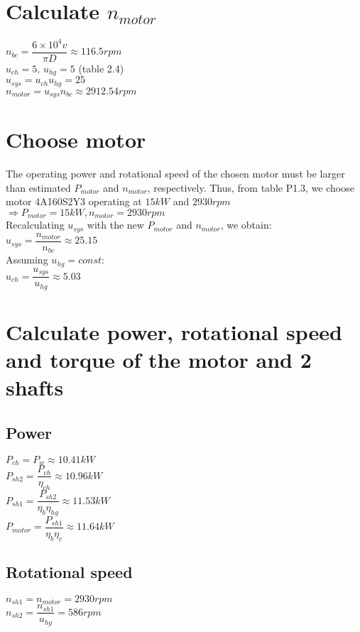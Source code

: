 \section{Calculate $ n_{motor} $}
$ n_{bc} = \dfrac{6\times10^4v}{\pi D} \approx 116.5 \unit{rpm}$\\
$ u_{ch} = 5$, $ u_{hg} = 5$ (table 2.4)\\
$ u_{sys} = u_{ch}u_{hg} = 25 $\\
$ n_{motor} = u_{sys}n_{bc} \approx 2912.54  \unit{rpm} $
\section{Choose motor}
The operating power and rotational speed of the chosen motor must be larger than estimated $ P_{motor} $ and $ n_{motor} $, respectively. Thus, from table P1.3, we choose motor 4A160S2Y3 operating at $ 15\unit{kW} $ and $ 2930\unit{rpm} $\\
$\Rightarrow P_{motor} = 15\unit{kW}, n_{motor} = 2930\unit{rpm}$\\
Recalculating $ u_{sys} $ with the new $ P_{motor} $ and $ n_{motor} $, we obtain:\\
$ u_{sys} = \dfrac{n_{motor}}{n_{bc}} \approx 25.15	$\\
Assuming $ u_{hg} = const $:\\
$ u_{ch} = \dfrac{u_{sys}}{u_{hg}} \approx 5.03$
\section{Calculate power, rotational speed and torque of the motor and 2 shafts}
\subsection{Power}
$ P_{ch} = P_w \approx 10.41\unit{kW}$\\
$ P_{sh2} = \dfrac{P_{ch}}{\eta_{ch}} \approx 10.96\unit{kW}$\\
$ P_{sh1} = \dfrac{P_{sh2}}{\eta_b\eta_{hg}} \approx 11.53\unit{kW}$\\
$ P_{motor} = \dfrac{P_{sh1}}{\eta_b\eta_c} \approx 11.64\unit{kW}$
\subsection{Rotational speed}
$ n_{sh1} = n_{motor} = 2930\unit{rpm}$\\
$ n_{sh2} = \dfrac{n_{sh1}}{u_{hg}} = 586 \unit{rpm}$
